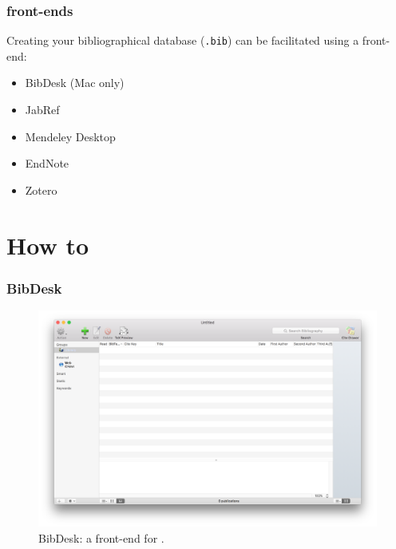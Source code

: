 \documentclass{beamer}
\begin{document}

\begin{frame}
    \frametitle{ front-ends}

Creating your bibliographical database (\texttt{.bib}) can be facilitated using a front-end:

\begin{itemize}
    \item BibDesk (Mac only)
    \item JabRef
    \item Mendeley Desktop
    \item EndNote
    \item Zotero
\end{itemize}

\end{frame}


\section{How to}


\begin{frame}
    \frametitle{BibDesk}

\begin{figure}
\includegraphics[width=\textwidth]{bibdesk}
\caption{BibDesk: a front-end for .}
\label{f:bibdesk}
\end{figure}

\end{frame}


\end{document}
